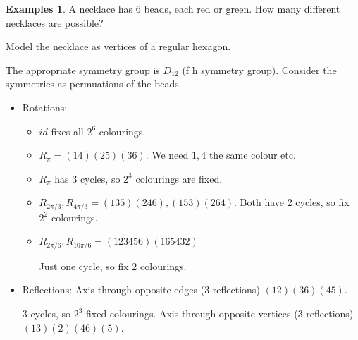 \documentclass{article}
\theoremstyle{definition}
\newtheorem*{exmps}{Examples}
\begin{document}
\begin{exmps}
  A necklace has 6 beads, each red or green. How many different necklaces are possible?

  Model the necklace as vertices of a regular hexagon.

  The appropriate symmetry group is $D_{12}$ (f h symmetry group). Consider the symmetries as permuations of the beads.

  \begin{itemize}
    \item Rotations: 
      \begin{itemize}
        \item 
        $id$ fixes all $2^6$ colourings. 
      \item $R_\pi = (14)(25)(36)$.
        We need $1,4$ the same colour etc.
      \item $R_\pi$ has 3 cycles, so $2^3$ colourings are fixed.

      \item $R_{2\pi/3},R_{4\pi/3}=(135)(246),(153)(264)$.
        Both have 2 cycles, so fix $2^2$ colourings.
      \item $R_{2\pi/6},R_{10\pi/6}=(123456)(165432)$

       Just one cycle, so fix 2 colourings. 
      \end{itemize}
      

     \item Reflections: Axis through opposite edges (3 reflections) $(12)(36)(45)$. 
       \begin{figure}[h]
         \centering

         \label{fig:necklace1}
       \end{figure}
      
       
       3 cycles, so $2^3$ fixed colourings. 
Axis through opposite vertices (3 reflections) 
       $(13)(2)(46)(5)$.

       \begin{figure}[h]
         \centering


\end{figure}
\end{itemize}
\end{exmps}
\end{document}
